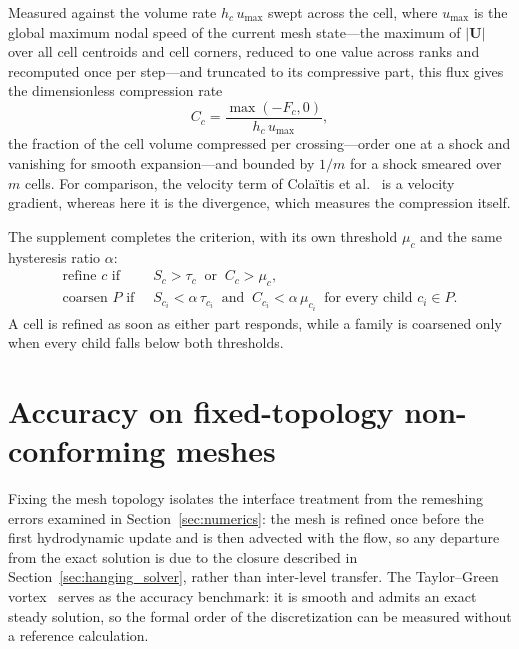 \documentclass[a4paper]{cas-sc}
\begin{document}
Measured against the volume rate \(h_c\,u_{\max}\) swept across the cell, where $u_{\max}$ is the global maximum nodal speed of the current mesh state---the maximum of \(|\boldsymbol U|\) over all cell centroids and cell corners, reduced to one value across ranks and recomputed once per step---and truncated to its compressive part, this flux
gives the dimensionless compression rate
\begin{equation}
	C_c=\frac{\max(-F_c,0)}{h_c\,u_{\max}},
	\label{eq:ck}
\end{equation}
the fraction of the cell volume compressed per crossing---order one at a shock and
vanishing for smooth expansion---and bounded by \(1/m\) for a shock smeared over
\(m\) cells. For comparison, the velocity term of Cola{\"i}tis
et al.~\cite{colaitis2026cell} is a velocity gradient, whereas here it is the
divergence, which measures the compression itself.

The supplement completes the criterion, with its own threshold \(\mu_c\) and the same
hysteresis ratio \(\alpha\):
\begin{equation}
	\begin{aligned}
		\text{refine } c \text{ if }\ & S_c>\tau_c \ \text{ or }\ C_c>\mu_c,\\
		\text{coarsen } P \text{ if }\ & S_{c_i}<\alpha\,\tau_{c_i} \ \text{ and }\ C_{c_i}<\alpha\,\mu_{c_i}\ \text{ for every child } c_i\in P.
	\end{aligned}
	\label{eq:criteria}
\end{equation}
A cell is refined as soon as either part responds, while a family is coarsened only
when every child falls below both thresholds.




\section{Accuracy on fixed-topology non-conforming meshes}
\label{sec:tgv_convergence}

Fixing the mesh topology isolates the interface treatment from the remeshing errors examined in Section~\ref{sec:numerics}: the mesh is refined once before the first hydrodynamic update and is then advected with the flow, so any departure from the exact solution is due to the closure described in Section~\ref{sec:hanging_solver}, rather than inter-level transfer. The Taylor--Green vortex~\cite{dobrev2012high} serves as the accuracy benchmark: it is smooth and admits an exact steady solution, so the formal order of the discretization can be measured without a reference calculation.
\end{document}
